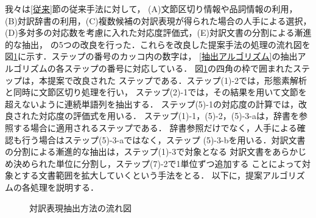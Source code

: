 我々は\ref{従来}節の従来手法に対して， (A)文節区切り情報や品詞情報の利用，
(B)対訳辞書の利用，(C)複数候補の対訳表現が得られた場合の人手による選択，
(D)多対多の対応数を考慮に入れた対応度評価式，(E)対訳文書の分割による漸進的な抽出，
の5つの改良を行った．これらを改良した提案手法の処理の流れ図を
図\ref{提案アルゴリズム}に示す．ステップの番号のカッコ内の数字は，
\ref{抽出アルゴリズム}の抽出アルゴリズムの各ステップの番号に対応している．
図\ref{提案アルゴリズム}の四角の枠で囲まれたステップは，本提案で改良された
ステップである．ステップ(1)-2では，形態素解析と同時に文節区切り処理を行い，
ステップ(2)-1では，その結果を用いて文節を超えないように連続単語列を抽出する．
ステップ(5)-1の対応度の計算では，改良された対応度の評価式を用いる．
ステップ(1)-1，(5)-2，(5)-3-aは，辞書を参照する場合に適用されるステップである．
辞書参照だけでなく，人手による確認も行う場合はステップ(5)-3-aではなく，ステップ
(5)-3-bを用いる．対訳文書の分割による漸進的な抽出は，ステップ(1)-3で対象となる
対訳文書をあらかじめ決められた単位に分割し，ステップ(7)-2で1単位ずつ追加する
ことによって対象とする文書範囲を拡大していくという手法をとる．
以下に，提案アルゴリズムの各処理を説明する．

\begin{figure}[t]
  \begin{center}
    \epsfxsize=9cm 
  \end{center}
  \caption{対訳表現抽出方法の流れ図}
  \label{提案アルゴリズム}
\end{figure}

\vspace{5mm}


